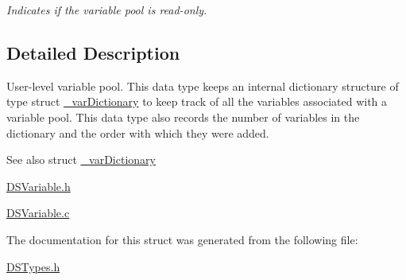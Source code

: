 \begin{DoxyCompactItemize}
\begin{DoxyCompactList}\small\item\em Indicates if the variable pool is read-\/only. \item\end{DoxyCompactList}\end{DoxyCompactItemize}


\subsection{Detailed Description}
User-\/level variable pool. This data type keeps an internal dictionary structure of type struct \hyperlink{struct__var_dictionary}{\_\-varDictionary} to keep track of all the variables associated with a variable pool. This data type also records the number of variables in the dictionary and the order with which they were added.

\begin{DoxySeeAlso}{See also}
struct \hyperlink{struct__var_dictionary}{\_\-varDictionary}

\hyperlink{_d_s_variable_8h}{DSVariable.h} 

\hyperlink{_d_s_variable_8c}{DSVariable.c} 
\end{DoxySeeAlso}


The documentation for this struct was generated from the following file:\begin{DoxyCompactItemize}
\item 
\hyperlink{_d_s_types_8h}{DSTypes.h}\end{DoxyCompactItemize}
